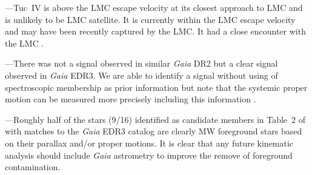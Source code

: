 \documentclass[twocolumn]{aastex63}
\begin{document}
---Tuc~IV is above the LMC escape velocity at its closest approach to LMC and is unlikely to be LMC satellite. It is currently within the LMC escape velocity and may have been recently captured by the LMC. 
It had a close encounter with the LMC \citep[see also ][]{Simon2020ApJ...892..137S}. 

---There was not a signal observed in similar {\it Gaia} DR2 \citep{Pace2019ApJ...875...77P} but  a clear signal observed in {\it Gaia}  EDR3. {We are able to identify a signal without using of spectroscopic membership as prior information but note that the systemic proper motion can be measured more precisely including this information \citep[e.g.,][]{Battaglia2022A&A...657A..54B}. }


---Roughly half of the stars (9/16) identified as candidate members in Table~2 of \citet{Willman2011AJ....142..128W} with matches to the {\it Gaia} EDR3 catalog are clearly MW foreground stars based on their parallax and/or proper motions. It is clear that any future kinematic analysis should include {\it Gaia} astrometry to improve the remove of foreground contamination.



\end{document}
